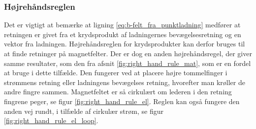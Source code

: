 \subsubsection{Højrehåndsreglen}
Det er vigtigt at bemærke at ligning \eqref{eq:b-felt_fra_punktladning} medfører at retningen er givet fra et krydsprodukt af ladningernes bevægelsesretning og en vektor fra ladningen. Højrehåndsreglen for krydsprodukter kan derfor bruges til at finde retninger på magnetfelter. Der er dog en anden højrehåndsregel, der giver samme resultater, som den fra afsnit \ref{fig:right_hand_rule_mat}, som er en fordel at bruge i dette tilfælde. Den fungerer ved at placere højre tommelfinger i strømmens retning eller ladningens bevægelses retning, hvorefter man krøller de andre fingre sammen. Magnetfeltet er så cirkulært om lederen i den retning fingrene peger, se figur \ref{fig:right_hand_rule_el}. Reglen kan også fungere den anden vej rundt, i tilfælde af cirkulær strøm, se figur \ref{fig:right_hand_rule_el_loop}.

